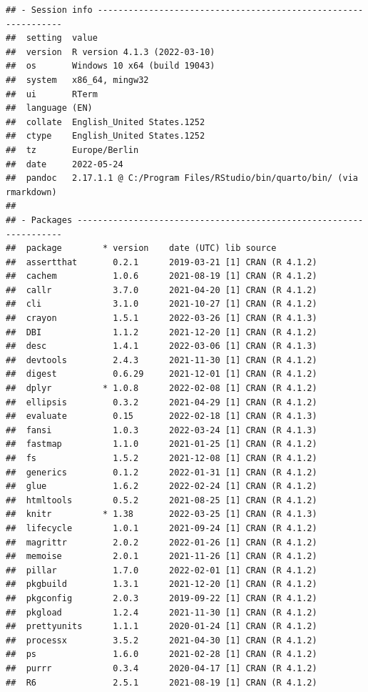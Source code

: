 \documentclass[10,a4paperpaper,]{article}
\begin{document}
\FloatBarrier

\begin{verbatim}
## - Session info ---------------------------------------------------------------
##  setting  value
##  version  R version 4.1.3 (2022-03-10)
##  os       Windows 10 x64 (build 19043)
##  system   x86_64, mingw32
##  ui       RTerm
##  language (EN)
##  collate  English_United States.1252
##  ctype    English_United States.1252
##  tz       Europe/Berlin
##  date     2022-05-24
##  pandoc   2.17.1.1 @ C:/Program Files/RStudio/bin/quarto/bin/ (via rmarkdown)
## 
## - Packages -------------------------------------------------------------------
##  package        * version    date (UTC) lib source
##  assertthat       0.2.1      2019-03-21 [1] CRAN (R 4.1.2)
##  cachem           1.0.6      2021-08-19 [1] CRAN (R 4.1.2)
##  callr            3.7.0      2021-04-20 [1] CRAN (R 4.1.2)
##  cli              3.1.0      2021-10-27 [1] CRAN (R 4.1.2)
##  crayon           1.5.1      2022-03-26 [1] CRAN (R 4.1.3)
##  DBI              1.1.2      2021-12-20 [1] CRAN (R 4.1.2)
##  desc             1.4.1      2022-03-06 [1] CRAN (R 4.1.3)
##  devtools         2.4.3      2021-11-30 [1] CRAN (R 4.1.2)
##  digest           0.6.29     2021-12-01 [1] CRAN (R 4.1.2)
##  dplyr          * 1.0.8      2022-02-08 [1] CRAN (R 4.1.2)
##  ellipsis         0.3.2      2021-04-29 [1] CRAN (R 4.1.2)
##  evaluate         0.15       2022-02-18 [1] CRAN (R 4.1.3)
##  fansi            1.0.3      2022-03-24 [1] CRAN (R 4.1.3)
##  fastmap          1.1.0      2021-01-25 [1] CRAN (R 4.1.2)
##  fs               1.5.2      2021-12-08 [1] CRAN (R 4.1.2)
##  generics         0.1.2      2022-01-31 [1] CRAN (R 4.1.2)
##  glue             1.6.2      2022-02-24 [1] CRAN (R 4.1.2)
##  htmltools        0.5.2      2021-08-25 [1] CRAN (R 4.1.2)
##  knitr          * 1.38       2022-03-25 [1] CRAN (R 4.1.3)
##  lifecycle        1.0.1      2021-09-24 [1] CRAN (R 4.1.2)
##  magrittr         2.0.2      2022-01-26 [1] CRAN (R 4.1.2)
##  memoise          2.0.1      2021-11-26 [1] CRAN (R 4.1.2)
##  pillar           1.7.0      2022-02-01 [1] CRAN (R 4.1.2)
##  pkgbuild         1.3.1      2021-12-20 [1] CRAN (R 4.1.2)
##  pkgconfig        2.0.3      2019-09-22 [1] CRAN (R 4.1.2)
##  pkgload          1.2.4      2021-11-30 [1] CRAN (R 4.1.2)
##  prettyunits      1.1.1      2020-01-24 [1] CRAN (R 4.1.2)
##  processx         3.5.2      2021-04-30 [1] CRAN (R 4.1.2)
##  ps               1.6.0      2021-02-28 [1] CRAN (R 4.1.2)
##  purrr            0.3.4      2020-04-17 [1] CRAN (R 4.1.2)
##  R6               2.5.1      2021-08-19 [1] CRAN (R 4.1.2)

\end{verbatim}
\end{document}
